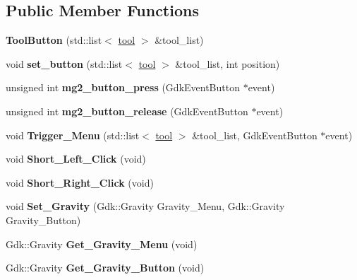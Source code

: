 \subsection*{Public Member Functions}
\begin{DoxyCompactItemize}
\item 
\mbox{\label{classToolButton_aef450af743cd86f6a7cbda0800d194a5}} 
{\bfseries Tool\+Button} (std\+::list$<$ \hyperlink{structtool}{tool} $>$ \&tool\+\_\+list)
\item 
\mbox{\label{classToolButton_ad46267b739c84cb5d7a51b7d80558c21}} 
void {\bfseries set\+\_\+button} (std\+::list$<$ \hyperlink{structtool}{tool} $>$ \&tool\+\_\+list, int position)
\item 
\mbox{\label{classToolButton_aaadf099440b0675255b8fae166793575}} 
unsigned int {\bfseries mg2\+\_\+button\+\_\+press} (Gdk\+Event\+Button $\ast$event)
\item 
\mbox{\label{classToolButton_ae319a44d3d609be7fa70f6ac74a0fe4a}} 
unsigned int {\bfseries mg2\+\_\+button\+\_\+release} (Gdk\+Event\+Button $\ast$event)
\item 
\mbox{\label{classToolButton_af3a79285581c2a0b1095bb8f3ad5691b}} 
void {\bfseries Trigger\+\_\+\+Menu} (std\+::list$<$ \hyperlink{structtool}{tool} $>$ \&tool\+\_\+list, Gdk\+Event\+Button $\ast$event)
\item 
\mbox{\label{classToolButton_a5bfec67198712d6aeecc0a96fe2563f8}} 
void {\bfseries Short\+\_\+\+Left\+\_\+\+Click} (void)
\item 
\mbox{\label{classToolButton_a399c17b718aa8f1d2a5eeac852101e9b}} 
void {\bfseries Short\+\_\+\+Right\+\_\+\+Click} (void)
\item 
\mbox{\label{classToolButton_adf5ecb10a5f58f8700b4a256be9b1704}} 
void {\bfseries Set\+\_\+\+Gravity} (Gdk\+::\+Gravity Gravity\+\_\+\+Menu, Gdk\+::\+Gravity Gravity\+\_\+\+Button)
\item 
\mbox{\label{classToolButton_a08262d8e864d10adce834a3386b5b8ad}} 
Gdk\+::\+Gravity {\bfseries Get\+\_\+\+Gravity\+\_\+\+Menu} (void)
\item 
\mbox{\label{classToolButton_a73e21b43b53e6fb9781490f7cef87101}} 
Gdk\+::\+Gravity {\bfseries Get\+\_\+\+Gravity\+\_\+\+Button} (void)
\end{DoxyCompactItemize}
